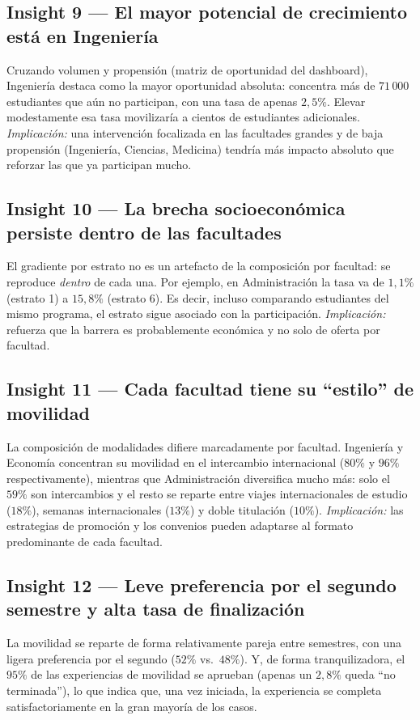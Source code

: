 \documentclass[12pt,a4paper]{article}
\begin{document}
\subsection*{Insight 9 --- El mayor potencial de crecimiento está en Ingeniería}
Cruzando volumen y propensión (matriz de oportunidad del dashboard), Ingeniería
destaca como la mayor oportunidad absoluta: concentra más de $71\,000$ estudiantes
que aún no participan, con una tasa de apenas $2{,}5\%$. Elevar modestamente esa
tasa movilizaría a cientos de estudiantes adicionales. \emph{Implicación:} una
intervención focalizada en las facultades grandes y de baja propensión
(Ingeniería, Ciencias, Medicina) tendría más impacto absoluto que reforzar las que
ya participan mucho.

\subsection*{Insight 10 --- La brecha socioeconómica persiste dentro de las facultades}
El gradiente por estrato no es un artefacto de la composición por facultad: se
reproduce \emph{dentro} de cada una. Por ejemplo, en Administración la tasa va de
$1{,}1\%$ (estrato 1) a $15{,}8\%$ (estrato 6). Es decir, incluso comparando
estudiantes del mismo programa, el estrato sigue asociado con la participación.
\emph{Implicación:} refuerza que la barrera es probablemente económica y no solo
de oferta por facultad.

\subsection*{Insight 11 --- Cada facultad tiene su ``estilo'' de movilidad}
La composición de modalidades difiere marcadamente por facultad. Ingeniería y
Economía concentran su movilidad en el intercambio internacional
($80\%$ y $96\%$ respectivamente), mientras que Administración diversifica mucho
más: solo el $59\%$ son intercambios y el resto se reparte entre viajes
internacionales de estudio ($18\%$), semanas internacionales ($13\%$) y doble
titulación ($10\%$). \emph{Implicación:} las estrategias de promoción y los
convenios pueden adaptarse al formato predominante de cada facultad.

\subsection*{Insight 12 --- Leve preferencia por el segundo semestre y alta tasa de finalización}
La movilidad se reparte de forma relativamente pareja entre semestres, con una
ligera preferencia por el segundo ($52\%$ vs.\ $48\%$). Y, de forma tranquilizadora,
el $95\%$ de las experiencias de movilidad se aprueban (apenas un $2{,}8\%$ queda
``no terminada''), lo que indica que, una vez iniciada, la experiencia se completa
satisfactoriamente en la gran mayoría de los casos.
\end{document}
